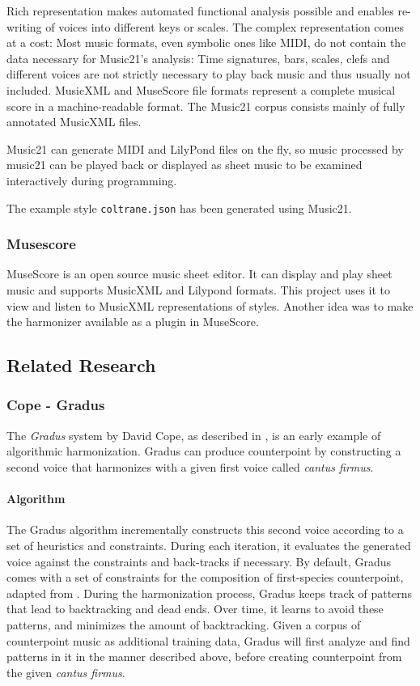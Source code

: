 Rich representation makes automated functional analysis possible and enables re-writing of voices into different keys or scales. The complex representation comes at a cost: Most music formats, even symbolic ones like MIDI, do not contain the data necessary for Music21's analysis: Time signatures, bars, scales, clefs and different voices are not strictly necessary to play back music and thus usually not included. MusicXML and MuseScore file formats represent a complete musical score in a machine-readable format. The Music21 corpus consists mainly of fully annotated MusicXML files.


Music21 can generate MIDI and LilyPond files on the fly, so music processed by music21 can be played back or displayed as sheet music to be examined interactively during programming.

The example style \texttt{coltrane.json} has been generated using Music21.

\subsubsection{Musescore}

MuseScore \cite{musescore} is an open source music sheet editor.
It can display and play sheet music and supports MusicXML and Lilypond formats.
This project uses it to view and listen to MusicXML representations of styles.
Another idea was to make the harmonizer available as a plugin in MuseScore.

\subsection{Related Research}

\subsubsection{Cope - Gradus}
The \emph{Gradus} system by David Cope, as described in \cite{cope2004musical}, is an early example of algorithmic harmonization. Gradus can produce counterpoint by constructing a second voice that harmonizes with a given first voice called \emph{cantus firmus}.

\paragraph{Algorithm} 
The Gradus algorithm incrementally constructs this second voice according to a set of heuristics and constraints. During each iteration, it evaluates the generated voice against the constraints and back-tracks if necessary. By default, Gradus comes with a set of constraints for the composition of first-species counterpoint, adapted from \cite{fux1742gradus}. During the harmonization process, Gradus keeps track of patterns that lead to backtracking and dead ends. Over time, it learns to avoid these patterns, and minimizes the amount of backtracking. Given a corpus of counterpoint music as additional training data, Gradus will first analyze and find patterns in it in the manner described above, before creating counterpoint from the given \emph{cantus firmus}.

